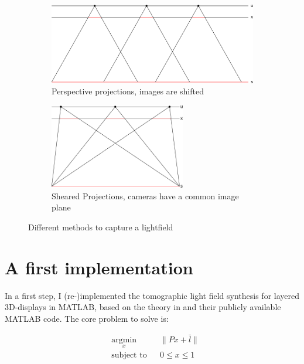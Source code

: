 \documentclass[11pt,a4paper,titlepage]{article}
\begin{document}
\begin{figure}
	\centering
	\begin{subfigure}[b]{0.4\textwidth}
 		\includegraphics[width=\textwidth]{sketches/perspective_shifted_projections.png}
  		\caption{Perspective projections, images are shifted}
   		\label{fig:perspective_shifted_projections}
	\end{subfigure}%
	\qquad
	\begin{subfigure}[b]{0.4\textwidth}
		\includegraphics[width=0.65\textwidth]{sketches/sheared_projections.png}
		\caption{Sheared Projections, cameras have a common image plane}
		\label{fig:sheared_projections}
	\end{subfigure}
	\caption{Different methods to capture a lightfield}\label{fig:animals}
\end{figure}

\section{A first implementation}
In a first step, I (re-)implemented the tomographic light field synthesis for layered 3D-displays in MATLAB, based on the theory in \cite{WETZ_TOMO} and their publicly available MATLAB code. The core problem to solve is:

\begin{equation} \label{eq:core_problem}
	\begin{aligned}
		& \underset{x}{\text{argmin}} & & \| Px + \bar{l} \| \\
		& \text{subject to} & & 0 \leq x \leq 1
	\end{aligned}
\end{equation}
\end{document}
